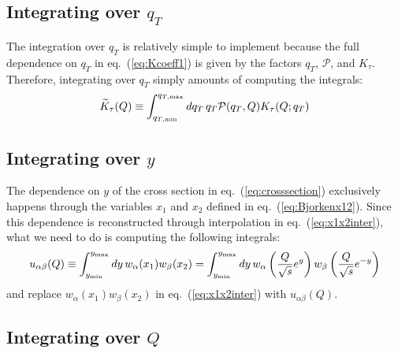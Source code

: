 \documentclass[10pt,a4paper]{article}
\begin{document}
\subsection{Integrating over $q_T$}

The integration over $q_T$ is relatively simple to implement because
the full dependence on $q_T$ in eq.~(\ref{eq:Kcoeff1}) is given by the
factors $q_T$, $\mathcal{P}$, and $K_\tau$. Therefore, integrating
over $q_T$ simply amounts of computing the integrals:
\begin{equation}\label{eq:KcoeffInt}
  \widetilde{K}_\tau(Q)\equiv \int_{q_{T,\rm min}}^{q_{T,\rm max}}dq_T\,q_T\mathcal{P}(q_T,Q) K_\tau(Q;q_T)
\end{equation}

\subsection{Integrating over $y$}

The dependence on $y$ of the cross section in
eq.~(\ref{eq:crosssection}) exclusively happens through the variables
$x_1$ and $x_2$ defined in eq.~(\ref{eq:Bjorkenx12}). Since this
dependence is reconstructed through interpolation in
eq.~(\ref{eq:x1x2inter}), what we need to do is computing the
following integrals:
\begin{equation}
u_{\alpha\beta}(Q)\equiv\int_{y_{\rm min}}^{y_{\rm max}}dy\,
w_\alpha(x_1)w_\beta(x_2) = \int_{y_{\rm min}}^{y_{\rm max}}dy\,w_\alpha\left(\frac{Q}{\sqrt{s}}e^y\right)w_\beta\left(\frac{Q}{\sqrt{s}}e^{-y}\right)
\end{equation}
and replace $w_\alpha(x_1)w_\beta(x_2)$ in eq.~(\ref{eq:x1x2inter})
with $u_{\alpha\beta}(Q)$.

\subsection{Integrating over $Q$}
\end{document}
